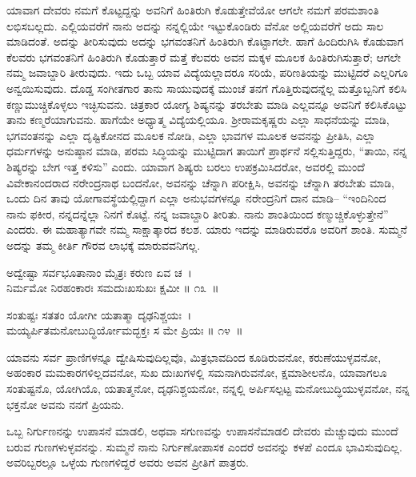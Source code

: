 ಯಾವಾಗ ದೇವರು ನಮಗೆ ಕೊಟ್ಟದ್ದನ್ನು ಅವನಿಗೆ ಹಿಂತಿರುಗಿ ಕೊಡುತ್ತೇವೆಯೋ ಆಗಲೇ ನಮಗೆ ಪರಮಶಾಂತಿ ಲಭಿಸಬಲ್ಲದು. ಎಲ್ಲಿಯವರೆಗೆ ನಾನು ಅದನ್ನು ನನ್ನಲ್ಲಿಯೇ ಇಟ್ಟುಕೊಂಡಿರು ವೆನೋ ಅಲ್ಲಿಯವರೆಗೆ ಅದು ಸಾಲ ಮಾಡಿದಂತೆ. ಅದನ್ನು ತೀರಿಸುವುದು ಅದನ್ನು ಭಗವಂತನಿಗೆ ಹಿಂತಿರುಗಿ ಕೊಟ್ಟಾಗಲೇ. ಹಾಗೆ ಹಿಂದಿರುಗಿಸಿ ಕೊಡುವಾಗ ಕೆಲವರು ಭಗವಂತನಿಗೆ ಹಿಂತಿರುಗಿ ಕೊಡುತ್ತಾರೆ ಮತ್ತೆ ಕೆಲವರು ಅವನ ಮಕ್ಕಳ ಮೂಲಕ ಹಿಂತಿರುಗಿಸುತ್ತಾರೆ; ಆಗಲೇ ನಮ್ಮ ಜವಾಬ್ದಾರಿ ತೀರುವುದು. ಇದು ಒಬ್ಬ ಯಾವ ವಿದ್ಯೆಯಲ್ಲಾದರೂ ಸರಿಯೆ, ಪರಿಣತಿಯನ್ನು ಮುಟ್ಟಿದರೆ ಎಲ್ಲರಿಗೂ ಅನ್ವಯಿಸುವುದು. ದೊಡ್ಡ ಸಂಗೀತಗಾರ ತಾನು ಸಾಯುವುದಕ್ಕೆ ಮುಂಚೆ ತನಗೆ ಗೊತ್ತಿರುವುದನ್ನೆಲ್ಲ ಮತ್ತೊಬ್ಬನಿಗೆ ಕಲಿಸಿ ಕಣ್ಣುಮುಚ್ಚಿಕೊಳ್ಳಲು ಇಚ್ಛಿಸುವನು. ಚಿತ್ರಕಾರ ಯೋಗ್ಯ ಶಿಷ್ಯನನ್ನು ತರಬೇತು ಮಾಡಿ ಎಲ್ಲವನ್ನೂ ಅವನಿಗೆ ಕಲಿಸಿಕೊಟ್ಟು ತಾನು ಕಣ್ಮರೆಯಾಗುವನು. ಹಾಗೆಯೇ ಅಧ್ಯಾತ್ಮ ವಿದ್ಯೆಯಲ್ಲಿಯೂ. ಶ‍್ರೀರಾಮಕೃಷ್ಣರು ಎಲ್ಲಾ ಸಾಧನೆಯನ್ನು ಮಾಡಿ, ಭಗವಂತನನ್ನು ಎಲ್ಲಾ ದೃಷ್ಟಿಕೋನದ ಮೂಲಕ ನೋಡಿ, ಎಲ್ಲಾ ಭಾವಗಳ ಮೂಲಕ ಅವನನ್ನು ಪ್ರೀತಿಸಿ, ಎಲ್ಲಾ ಧರ್ಮಗಳನ್ನು ಅನುಷ್ಠಾನ ಮಾಡಿ, ಪರಮ ಸಿದ್ಧಿಯನ್ನು ಮುಟ್ಟಿದಾಗ ತಾಯಿಗೆ ಪ್ರಾರ್ಥನೆ ಸಲ್ಲಿಸುತ್ತಿದ್ದರು, “ತಾಯಿ, ನನ್ನ ಶಿಷ್ಯರನ್ನು ಬೇಗ ಇತ್ತ ಕಳಿಸು” ಎಂದು. ಯಾವಾಗ ಶಿಷ್ಯರು ಬರಲು ಉಪಕ್ರಮಿಸಿದರೋ, ಅವರಲ್ಲಿ ಮುಂದೆ ವಿವೇಕಾನಂದರಾದ ನರೇಂದ್ರನಾಥ ಬಂದನೋ, ಅವನನ್ನು ಚೆನ್ನಾಗಿ ಪರೀಕ್ಷಿಸಿ, ಅವನನ್ನು ಚೆನ್ನಾಗಿ ತರಬೇತು ಮಾಡಿ, ಒಂದು ದಿನ ತಾವು ಯೋಗಾವಸ್ಥೆಯಲ್ಲಿದ್ದಾಗ ಎಲ್ಲಾ ಅನುಭವಗಳನ್ನೂ ನರೇಂದ್ರನಿಗೆ ದಾನ ಮಾಡಿ– “ಇಂದಿನಿಂದ ನಾನು ಫಕೀರ, ನನ್ನದನ್ನೆಲ್ಲಾ ನಿನಗೆ ಕೊಟ್ಟೆ. ನನ್ನ ಜವಾಬ್ದಾರಿ ತೀರಿತು. ನಾನು ಶಾಂತಿಯಿಂದ ಕಣ್ಮುಚ್ಚಿಕೊಳ್ಳುತ್ತೇನೆ” ಎಂದರು. ಈ ಮಹಾತ್ಯಾಗವೇ ನಮ್ಮ ಸಾಕ್ಷಾತ್ಕಾರದ ಕಲಶ. ಯಾರು ಇದನ್ನು ಮಾಡಿರುವರೊ ಅವರಿಗೆ ಶಾಂತಿ. ಸುಮ್ಮನೆ ಅದನ್ನು ತಮ್ಮ ಕೀರ್ತಿ ಗೌರವ ಲಾಭಕ್ಕೆ ಮಾರುವವನಿಗಲ್ಲ.

\begin{shloka}
ಅದ್ವೇಷ್ಟಾ ಸರ್ವಭೂತಾನಾಂ ಮೈತ್ರಃ ಕರುಣ ಏವ ಚ~।\\ನಿರ್ಮಮೋ ನಿರಹಂಕಾರಃ ಸಮದುಃಖಸುಖಃ ಕ್ಷಮೀ \hfill॥ ೧೩~॥
\end{shloka}

\begin{shloka}
ಸಂತುಷ್ಟಃ ಸತತಂ ಯೋಗೀ ಯತಾತ್ಮಾ ದೃಢನಿಶ್ಚಯಃ~।\\ಮಯ್ಯರ್ಪಿತಮನೋಬುದ್ಧಿರ್ಯೋಮದ್ಭಕ್ತಃ ಸ ಮೇ ಪ್ರಿಯಃ \hfill॥ ೧೪~॥
\end{shloka}

\begin{artha}
ಯಾವನು ಸರ್ವ ಪ್ರಾಣಿಗಳನ್ನೂ ದ್ವೇಷಿಸುವುದಿಲ್ಲವೊ, ಮಿತ್ರಭಾವದಿಂದ ಕೂಡಿರುವನೋ, ಕರುಣೆಯುಳ್ಳವನೋ, ಅಹಂಕಾರ ಮಮಕಾರಗಳಿಲ್ಲದವನೋ, ಸುಖ ದುಃಖಗಳಲ್ಲಿ ಸಮನಾಗಿರು\-ವನೋ, ಕ್ಷಮಾಶೀಲನೊ, ಯಾವಾಗಲೂ ಸಂತುಷ್ಟನೊ, ಯೋಗಿಯೊ, ಯತಾತ್ಮನೋ, ದೃಢ\-ನಿಶ್ಚಯನೋ, ನನ್ನಲ್ಲಿ ಅರ್ಪಿಸಲ್ಪಟ್ಟ ಮನೋಬುದ್ಧಿಯುಳ್ಳವನೋ, ನನ್ನ ಭಕ್ತನೋ ಅವನು ನನಗೆ ಪ್ರಿಯನು.
\end{artha}

ಒಬ್ಬ ನಿರ್ಗುಣನನ್ನು ಉಪಾಸನೆ ಮಾಡಲಿ, ಅಥವಾ ಸಗುಣವನ್ನು ಉಪಾಸನೆ\break ಮಾಡಲಿ ದೇವರು ಮೆಚ್ಚುವುದು ಮುಂದೆ ಬರುವ ಗುಣಗಳುಳ್ಳವನನ್ನು. ಸುಮ್ಮನೆ ನಾನು ನಿರ್ಗುಣೋಪಾಸಕ ಎಂದರೆ ಅವನನ್ನು ಕಳಪೆ ಎಂದೂ ಭಾವಿಸುವುದಿಲ್ಲ. ಅವರಿಬ್ಬರಲ್ಲೂ ಒಳ್ಳೆಯ ಗುಣಗಳಿದ್ದರೆ ಅವರು ಅವನ ಪ್ರೀತಿಗೆ ಪಾತ್ರರು.

